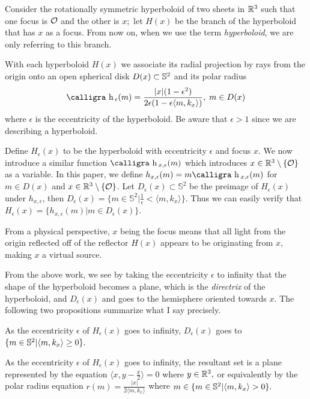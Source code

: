\documentclass[review]{elsarticle}
\newcommand{\h}{\text{\calligra h}\,}
\begin{document}
Consider the rotationally symmetric hyperboloid of two sheets in $\mathbb{R}^3$ such that one focus is $\mathcal{O}$ and the other is $x;$ let $H(x)$ be the branch of the hyperboloid that has $x$ as a focus. From now on, when we use the term {\it hyperboloid}, we are only referring to this branch. 

With each hyperboloid $H(x)$ we associate its radial projection by rays from the origin onto an open spherical disk $D(x)\subset \mathbb{S}^2$ and its polar radius
\begin{equation}
    \h_\epsilon(m)=\frac{|x|(1-\epsilon^2)}{2\epsilon(1-\epsilon\langle m , k_{x}\rangle)}, \; m\in D(x)
\end{equation}
where $\epsilon$ is the eccentricity of the hyperboloid. Be aware that $\epsilon>1$ since we are describing a hyperboloid. 

Define $H_{\epsilon}(x)$ to be the hyperboloid with eccentricity $\epsilon$ and focus $x$. We now introduce a similar function $\h_{x,\epsilon}(m)$ which introduces $x\in \mathbb{R}^3\setminus \{\mathcal{O}\}$ as a variable.  In this paper, we define $h_{x,\epsilon} (m)=m\h_{x,\epsilon}(m)$ for $m\in D(x)$ and $x\in \mathbb{R}^3\setminus \{\mathcal{O}\}$. Let  $D_\epsilon(x)\subset \mathbb{S}^2$ be the preimage of $H_{\epsilon}(x)$ under $h_{x,\epsilon}$, then $D_\epsilon(x)=\{m\in \mathbb{S}^2|\frac{1}{\epsilon} <\langle m , k_{x}\rangle\}$. Thus we can easily verify that $H_\epsilon(x)=\{h_{x,\epsilon}(m)|m\in D_\epsilon(x)\}$.



From a physical perspective, $x$ being the focus means that all light from the origin reflected off of the reflector $H(x)$ appears to be originating from $x$, making $x$ a virtual source.

From the above work, we see by taking the eccentricity $\epsilon$ to infinity that the shape of the hyperboloid becomes a plane, which is the {\it directrix} of the hyperboloid, and $D_\epsilon(x)$ and goes to the hemisphere oriented towards $x$. The following two propositions summarize what I say precisely. 

\begin{prop}\label{eccdom}
 As the eccentricity $\epsilon$ of $H_{\epsilon}(x)$ goes to infinity, $D_\epsilon(x)$ goes to $\{m\in \mathbb{S}^2|\langle m,k_x\rangle\ge 0\}.$
\end{prop}

\begin{prop} \label{eccplane}
 As the eccentricity $\epsilon$ of $H_{\epsilon}(x)$ goes to infinity, the resultant set is a plane represented by the equation $\langle x,y-\frac{x}{2} \rangle=0$ where $y\in\mathbb{R}^3,$ or equivalently by the polar radius equation $r(m)=\frac{|x|}{2\langle m,k_x\rangle}$ where $m\in\{m\in \mathbb{S}^2|\langle m,k_x\rangle> 0\}.$
\end{prop}
\end{document}

